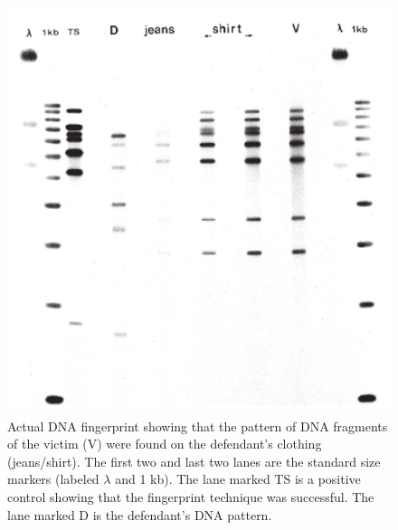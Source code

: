 \documentclass[
  ignorenonframetext,
  aspectratio=169]{beamer}
\begin{document}
\begin{frame}{}
\protect\hypertarget{section-7}{}
\begin{figure}
\includegraphics[width=0.4\linewidth]{../images/fingerprint_lanes} \caption{Actual DNA fingerprint showing that the pattern of DNA fragments of the victim (V) were found on the defendant's clothing (jeans/shirt). The first two and last two lanes are the standard size markers (labeled $\lambda$ and 1 kb). The lane marked TS is a positive control showing that the fingerprint technique was successful. The lane marked D is the defendant's DNA pattern.}\label{fig:fingerprint-lanes}
\end{figure}
\end{frame}
\end{document}
